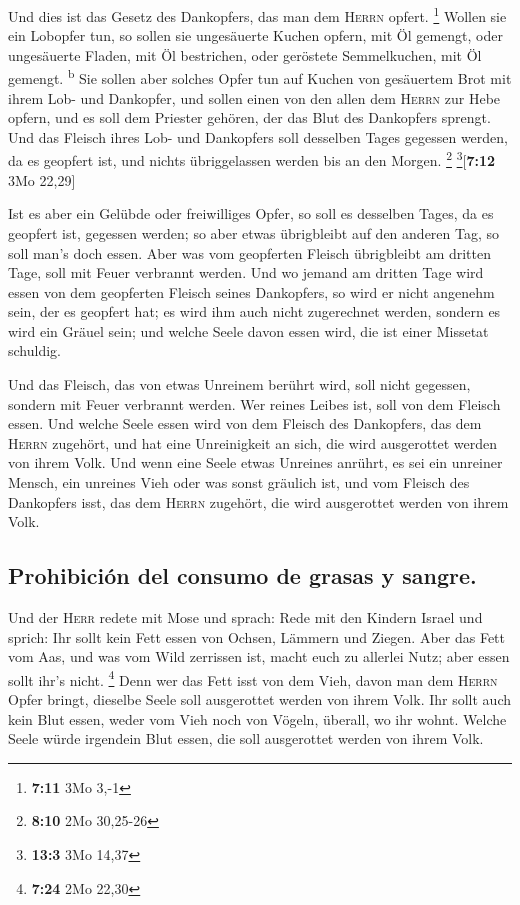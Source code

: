  Und dies ist das Gesetz des Dankopfers, das man dem
\textsc{Herrn} opfert. \footnote{\textbf{7:11} 3Mo 3,-1} 
Wollen sie ein Lobopfer tun, so sollen sie ungesäuerte Kuchen opfern,
mit Öl gemengt, oder ungesäuerte Fladen, mit Öl bestrichen, oder
geröstete Semmelkuchen, mit Öl gemengt. \textsuperscript{b}
 Sie sollen aber solches Opfer tun auf Kuchen von
gesäuertem Brot mit ihrem Lob- und Dankopfer,  und sollen
einen von den allen dem \textsc{Herrn} zur Hebe opfern, und es soll dem
Priester gehören, der das Blut des Dankopfers sprengt. 
Und das Fleisch ihres Lob- und Dankopfers soll desselben Tages gegessen
werden, da es geopfert ist, und nichts übriggelassen werden bis an den
Morgen. \footnote{\textbf{8:10} 2Mo 30,25-26}
\footnote{\textbf{13:3} 3Mo 14,37}{[}\textbf{7:12} 3Mo 22,29{]}

 Ist es aber ein Gelübde oder freiwilliges Opfer, so soll
es desselben Tages, da es geopfert ist, gegessen werden; so aber etwas
übrigbleibt auf den anderen Tag, so soll man's doch essen.
 Aber was vom geopferten Fleisch übrigbleibt am dritten
Tage, soll mit Feuer verbrannt werden.  Und wo jemand am
dritten Tage wird essen von dem geopferten Fleisch seines Dankopfers, so
wird er nicht angenehm sein, der es geopfert hat; es wird ihm auch nicht
zugerechnet werden, sondern es wird ein Gräuel sein; und welche Seele
davon essen wird, die ist einer Missetat schuldig.

 Und das Fleisch, das von etwas Unreinem berührt wird,
soll nicht gegessen, sondern mit Feuer verbrannt werden. Wer reines
Leibes ist, soll von dem Fleisch essen.  Und welche Seele
essen wird von dem Fleisch des Dankopfers, das dem \textsc{Herrn}
zugehört, und hat eine Unreinigkeit an sich, die wird ausgerottet werden
von ihrem Volk.  Und wenn eine Seele etwas Unreines
anrührt, es sei ein unreiner Mensch, ein unreines Vieh oder was sonst
gräulich ist, und vom Fleisch des Dankopfers isst, das dem
\textsc{Herrn} zugehört, die wird ausgerottet werden von ihrem Volk.

\hypertarget{prohibiciuxf3n-del-consumo-de-grasas-y-sangre.}{%
\subsection{Prohibición del consumo de grasas y
sangre.}\label{prohibiciuxf3n-del-consumo-de-grasas-y-sangre.}}

 Und der \textsc{Herr} redete mit Mose und sprach:
 Rede mit den Kindern Israel und sprich: Ihr sollt kein
Fett essen von Ochsen, Lämmern und Ziegen.  Aber das Fett
vom Aas, und was vom Wild zerrissen ist, macht euch zu allerlei Nutz;
aber essen sollt ihr's nicht. \footnote{\textbf{7:24} 2Mo 22,30}
 Denn wer das Fett isst von dem Vieh, davon man dem
\textsc{Herrn} Opfer bringt, dieselbe Seele soll ausgerottet werden von
ihrem Volk.  Ihr sollt auch kein Blut essen, weder vom
Vieh noch von Vögeln, überall, wo ihr wohnt.  Welche
Seele würde irgendein Blut essen, die soll ausgerottet werden von ihrem
Volk.

